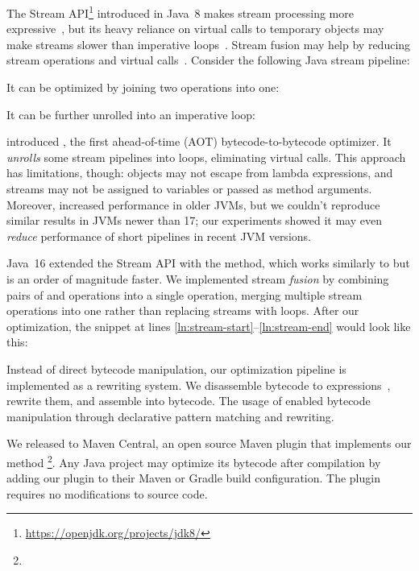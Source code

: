 
The Stream API\footnote{\url{https://openjdk.org/projects/jdk8/}} introduced in Java~8 makes stream processing more expressive~\citep{kiselyov2017}, but its heavy reliance on virtual calls to temporary objects may make streams slower than imperative loops~\citep{khatchadourian2020study}.
Stream fusion may help by reducing stream operations and virtual calls~\citep{hirzel2014catalog}.
Consider the following Java stream pipeline:

It can be optimized by joining two  operations into one:

It can be further unrolled into an imperative loop:


\citet{moller2020eliminating} introduced \streamliner{}, the first ahead-of-time (AOT) bytecode-to-bytecode optimizer.
It \emph{unrolls} some stream pipelines into loops, eliminating virtual calls.
This approach has limitations, though: objects may not escape from lambda expressions, and streams may not be assigned to variables or passed as method arguments.
Moreover, \streamliner{} increased performance in older JVMs, but we couldn't reproduce similar results in JVMs newer than 17; our experiments showed it may even \emph{reduce} performance of short pipelines in recent JVM versions.

Java~16 extended the Stream API with the  method, which works similarly to  but is an order of magnitude faster.
We implemented stream \emph{fusion} by combining pairs of  and  operations into a single  operation, merging multiple stream operations into one rather than replacing streams with loops.
After our optimization, the snippet at lines \ref{ln:stream-start}--\ref{ln:stream-end} would look like this:



Instead of direct bytecode manipulation, our optimization pipeline is implemented as a rewriting system.
We disassemble bytecode to \phic{} expressions~\citep{bugayenko2021eolang}, rewrite them, and assemble into bytecode.
The usage of \phic{} enabled bytecode manipulation through declarative pattern matching and rewriting.

We released \hone{} to Maven Central, an open source Maven plugin that implements our method%
  \footnote{}.
Any Java project may optimize its bytecode after compilation by adding our plugin to their Maven or Gradle build configuration.
The plugin requires no modifications to source code.

